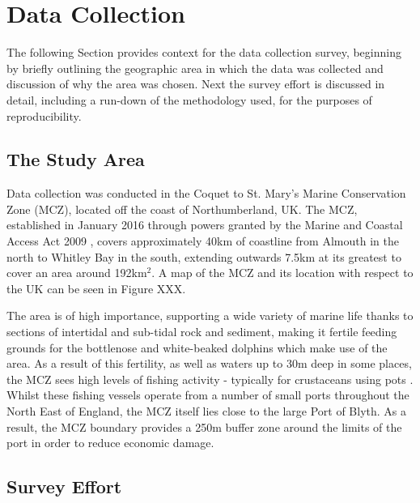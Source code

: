 \section{Data Collection}\label{ch:NDD,sec:dataCollection}

The following Section provides context for the data collection survey, beginning by briefly outlining the geographic area in which the data was collected and discussion of why the area was chosen. Next the survey effort is discussed in detail, including a run-down of the methodology used, for the purposes of reproducibility. 

\subsection{The Study Area}\label{ch:NDD,sec:dataCollection,sub:studyArea}

Data collection was conducted in the Coquet to St. Mary's Marine Conservation Zone (MCZ), located off the coast of Northumberland, UK. The MCZ, established in January 2016 through powers granted by the Marine and Coastal Access Act 2009 \cite{noauthor_marine_2009}, covers approximately 40km of coastline from Almouth in the north to Whitley Bay in the south, extending outwards 7.5km at its greatest to cover an area around 192km$^{2}$. A map of the MCZ and its location with respect to the UK can be seen in Figure XXX.


The area is of high importance, supporting a wide variety of marine life thanks to sections of intertidal and sub-tidal rock and sediment, making it fertile feeding grounds for the bottlenose and white-beaked dolphins which make use of the area. As a result of this fertility, as well as waters up to 30m deep in some places, the MCZ sees high levels of fishing activity - typically for crustaceans using pots \cite{stephenson_spatial_2017}. Whilst these fishing vessels operate from a number of small ports throughout the North East of England, the MCZ itself lies close to the large Port of Blyth. As a result, the MCZ boundary provides a 250m buffer zone around the limits of the port in order to reduce economic damage. 


\subsection{Survey Effort}\label{ch:NDD,sec:dataCollection,sub:surveyArea}

